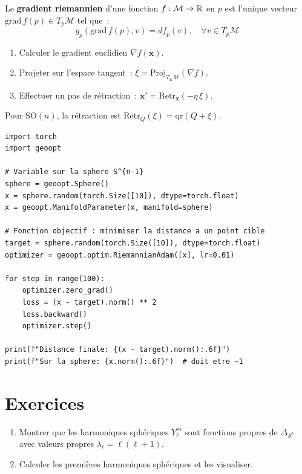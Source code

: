 \begin{definition}
Le \textbf{gradient riemannien} d'une fonction $f: \mathcal{M} \to \mathbb{R}$ en $p$
est l'unique vecteur $\mathrm{grad}\, f(p) \in T_p\mathcal{M}$ tel que~:
\[
    g_p(\mathrm{grad}\, f(p), v) = df_p(v), \quad \forall v \in T_p\mathcal{M}
\]
\end{definition}

\begin{algorithme}[title=\textbf{Descente de gradient riemannienne}]
\begin{enumerate}
    \item Calculer le gradient euclidien $\nabla f(\mathbf{x})$.
    \item Projeter sur l'espace tangent~: $\xi = \mathrm{Proj}_{T_\mathbf{x}\mathcal{M}}(\nabla f)$.
    \item Effectuer un pas de r\'etraction~: $\mathbf{x}' = \mathrm{Retr}_\mathbf{x}(-\eta\, \xi)$.
\end{enumerate}
Pour $\mathrm{SO}(n)$, la r\'etraction est $\mathrm{Retr}_Q(\xi) = \mathrm{qr}(Q + \xi)$.
\end{algorithme}

\begin{codeblock}[title=\textbf{Optimisation sur la sph\`ere avec geoopt}]
\begin{verbatim}
import torch
import geoopt

# Variable sur la sphere S^{n-1}
sphere = geoopt.Sphere()
x = sphere.random(torch.Size([10]), dtype=torch.float)
x = geoopt.ManifoldParameter(x, manifold=sphere)

# Fonction objectif : minimiser la distance a un point cible
target = sphere.random(torch.Size([10]), dtype=torch.float)
optimizer = geoopt.optim.RiemannianAdam([x], lr=0.01)

for step in range(100):
    optimizer.zero_grad()
    loss = (x - target).norm() ** 2
    loss.backward()
    optimizer.step()

print(f"Distance finale: {(x - target).norm():.6f}")
print(f"Sur la sphere: {x.norm():.6f}")  # doit etre ~1
\end{verbatim}
\end{codeblock}

\section*{Exercices}

\begin{exercice}
\begin{enumerate}
    \item Montrer que les harmoniques sph\'eriques $Y_\ell^m$ sont fonctions
          propres de $\Delta_{S^2}$ avec valeurs propres $\lambda_\ell = \ell(\ell+1)$.
    \item Calculer les premi\`eres harmoniques sph\'eriques et les visualiser.
\end{enumerate}
\end{exercice}

